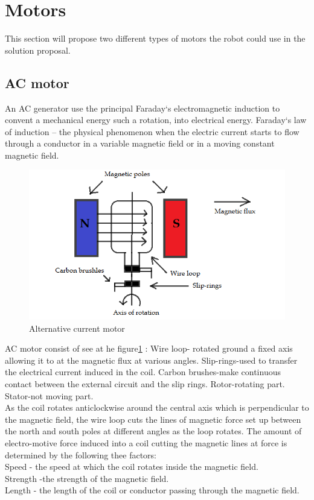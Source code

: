 \section{Motors}
This section will propose two different types of motors the robot could use in the solution proposal.

\subsection{AC motor}
An AC generator use the principal Faraday‘s electromagnetic induction to convent a mechanical energy such a rotation, into electrical energy. Faraday‘s law of induction – the physical phenomenon when the electric current starts to flow through a conductor in a variable magnetic field or in a moving constant magnetic field. \\

\begin{figure}[h]
    \centering
    \includegraphics[width=.7\textwidth]{figures/Alternative_current_(AC).png}
    \caption{Alternative current motor } 
    \label{fig:ACmotor} 
\end{figure}

AC motor consist of see at he figure\ref{fig:ACmotor} : Wire loop- rotated ground a fixed axis allowing it to at the magnetic flux at various angles.
Slip-rings-used to transfer the electrical current induced in the coil.
Carbon brushes-make continuous contact between the external circuit and the slip rings.
Rotor-rotating part.
Stator-not moving part.\\
As the coil rotates anticlockwise around the central axis which is perpendicular to the magnetic field, the wire loop cuts the lines of magnetic force set up between the north and south poles at different angles as the loop rotates.
The amount of electro-motive force induced into a coil cutting the magnetic lines at force is determined by the following thee factors:\\
Speed - the speed at which the coil rotates inside the magnetic field.\\
Strength -the strength of the magnetic field.\\
Length - the length of the coil or conductor passing through the magnetic field.\\

